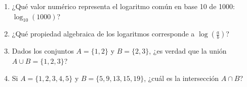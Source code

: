 \documentclass[10pt,a4paper]{article}
\begin{document}
\begin{enumerate}[label=\textbf{\arabic*.}]
\begin{enumerate}[label=\textbf{\Alph*)}]
\end{enumerate}
\vspace{0.15cm}
\item ¿Qué valor numérico representa el logaritmo común en base 10 de 1000: \(\log_{10}(1000)\)?
\begin{enumerate}[label=\textbf{\Alph*)}]
\end{enumerate}
\vspace{0.15cm}
\item ¿Qué propiedad algebraica de los logaritmos corresponde a \(\log(\frac{a}{b})\)?
\begin{enumerate}[label=\textbf{\Alph*)}]
\end{enumerate}
\vspace{0.15cm}
\item Dados los conjuntos \(A = \{1, 2\}\) y \(B = \{2, 3\}\), ¿es verdad que la unión \(A \cup B = \{1, 2, 3\}\)?
\begin{enumerate}[label=\textbf{\Alph*)}]
\end{enumerate}
\vspace{0.15cm}
\item Si \(A = \{1, 2, 3, 4, 5\}\) y \(B = \{5, 9, 13, 15, 19\}\), ¿cuál es la intersección \(A \cap B\)?
\begin{enumerate}[label=\textbf{\Alph*)}]
\end{enumerate}
\end{enumerate}
\end{document}
